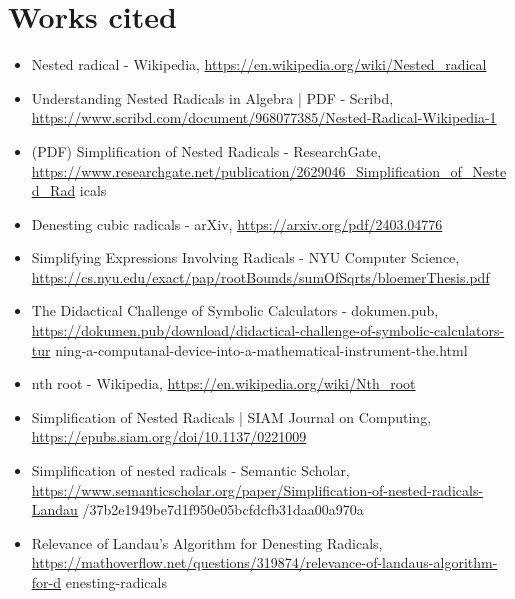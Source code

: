\documentclass[10pt]{article}
\begin{document}
\section*{Works cited}
\begin{itemize}
  \item[1.] Nested radical - Wikipedia, \href{https://en.wikipedia.org/wiki/Nested_radical}{https://en.wikipedia.org/wiki/Nested\_radical}
  \item[2.] Understanding Nested Radicals in Algebra | PDF - Scribd, \href{https://www.scribd.com/document/968077385/Nested-Radical-Wikipedia-1}{https://www.scribd.com/document/968077385/Nested-Radical-Wikipedia-1}
  \item[3.] (PDF) Simplification of Nested Radicals - ResearchGate, \href{https://www.researchgate.net/publication/2629046_Simplification_of_Nested_Rad}{https://www.researchgate.net/publication/2629046\_Simplification\_of\_Nested\_Rad} icals
  \item[4.] Denesting cubic radicals - arXiv, \href{https://arxiv.org/pdf/2403.04776}{https://arxiv.org/pdf/2403.04776}
  \item[5.] Simplifying Expressions Involving Radicals - NYU Computer Science, \href{https://cs.nyu.edu/exact/pap/rootBounds/sumOfSqrts/bloemerThesis.pdf}{https://cs.nyu.edu/exact/pap/rootBounds/sumOfSqrts/bloemerThesis.pdf}
  \item[6.] The Didactical Challenge of Symbolic Calculators - dokumen.pub, \href{https://dokumen.pub/download/didactical-challenge-of-symbolic-calculators-tur}{https://dokumen.pub/download/didactical-challenge-of-symbolic-calculators-tur} ning-a-computanal-device-into-a-mathematical-instrument-the.html
  \item[7.] nth root - Wikipedia, \href{https://en.wikipedia.org/wiki/Nth_root}{https://en.wikipedia.org/wiki/Nth\_root}
  \item[8.] Simplification of Nested Radicals | SIAM Journal on Computing, \href{https://epubs.siam.org/doi/10.1137/0221009}{https://epubs.siam.org/doi/10.1137/0221009}
  \item[9.] [PDF] Simplification of nested radicals - Semantic Scholar, \href{https://www.semanticscholar.org/paper/Simplification-of-nested-radicals-Landau}{https://www.semanticscholar.org/paper/Simplification-of-nested-radicals-Landau} /37b2e1949be7d1f950e05bcfdcfb31daa00a970a
  \item[10.] Relevance of Landau's Algorithm for Denesting Radicals, \href{https://mathoverflow.net/questions/319874/relevance-of-landaus-algorithm-for-d}{https://mathoverflow.net/questions/319874/relevance-of-landaus-algorithm-for-d} enesting-radicals

\end{itemize}
\end{document}

